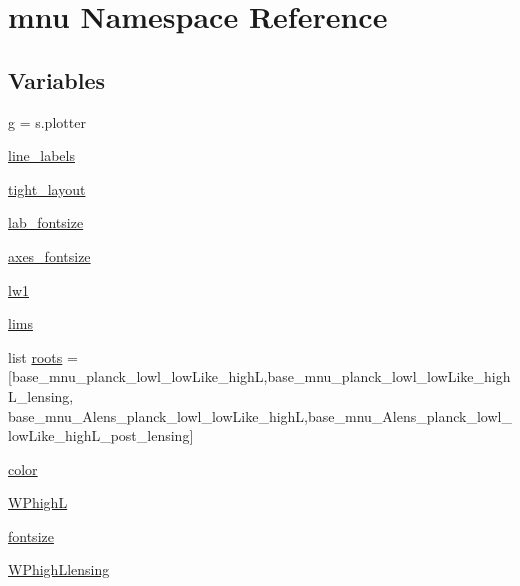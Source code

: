 \hypertarget{namespacemnu}{}\section{mnu Namespace Reference}
\label{namespacemnu}
\subsection*{Variables}
\begin{DoxyCompactItemize}
\item 
\mbox{\hyperlink{namespacemnu_a14a11de5e770f41762ffff4056381801}{g}} = s.\+plotter
\item 
\mbox{\hyperlink{namespacemnu_a05c2f5f02969108b3947d979204838ba}{line\+\_\+labels}}
\item 
\mbox{\hyperlink{namespacemnu_a03e53c384c255ce0c1122a12d6f94222}{tight\+\_\+layout}}
\item 
\mbox{\hyperlink{namespacemnu_ae355a9f6788281673624d466df79ed24}{lab\+\_\+fontsize}}
\item 
\mbox{\hyperlink{namespacemnu_aac28a0b5724b6e14b1af666a7b268421}{axes\+\_\+fontsize}}
\item 
\mbox{\hyperlink{namespacemnu_ad247c59037025fbaf44dbd6c006be916}{lw1}}
\item 
\mbox{\hyperlink{namespacemnu_a365b201edb3fd71dc44bbc44e758a407}{lims}}
\item 
list \mbox{\hyperlink{namespacemnu_a1b909820032e069f2cfc2141c5d3a716}{roots}} = \mbox{[}\textquotesingle{}base\+\_\+mnu\+\_\+planck\+\_\+lowl\+\_\+low\+Like\+\_\+highL\textquotesingle{},\textquotesingle{}base\+\_\+mnu\+\_\+planck\+\_\+lowl\+\_\+low\+Like\+\_\+high\+L\+\_\+lensing\textquotesingle{}, \textquotesingle{}base\+\_\+mnu\+\_\+\+Alens\+\_\+planck\+\_\+lowl\+\_\+low\+Like\+\_\+highL\textquotesingle{},\textquotesingle{}base\+\_\+mnu\+\_\+\+Alens\+\_\+planck\+\_\+lowl\+\_\+low\+Like\+\_\+high\+L\+\_\+post\+\_\+lensing\textquotesingle{}\mbox{]}
\item 
\mbox{\hyperlink{namespacemnu_a41d7606a9736b45bc9bd7c348e04b6e2}{color}}
\item 
\mbox{\hyperlink{namespacemnu_afea9ed84723cd13f4ba621f47d1196e5}{W\+PhighL}}
\item 
\mbox{\hyperlink{namespacemnu_a86e38fe731d243a8099cc96540d41cad}{fontsize}}
\item 
\mbox{\hyperlink{namespacemnu_af1c753bc1e12c8705292f14340cf3499}{W\+Phigh\+Llensing}}
\end{DoxyCompactItemize}


